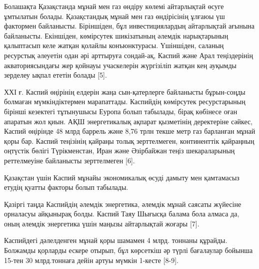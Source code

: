 \begin{multicols}{2}
Болашақта Қазақстанда мұнай мен газ өндіру көлемі айтарлықтай өсуге
ұмтылатын болады. Қазақстандық мұнай мен газ өндірісінің ұлғаюы үш
фактормен байланысты. Біріншіден, бұл инвестициялардың айтарлықтай
ағынына байланысты. Екіншіден, көмірсутек шикізатының әлемдік
нарықтарының қалыптасып келе жатқан қолайлы конъюнктурасы. Үшіншіден,
саланың ресурстық әлеуетін одан әрі арттыруға сондай-ақ, Каспий және
Арал теңіздерінің акваториясындағы жер қойнауы учаскелерін жүргізіліп
жатқан кең ауқымды зерделеу ықпал ететін болады {[}5{]}.

ХХІ ғ. Каспий өңірінің елдерін жаңа сын-қатерлерге байланысты
бұрын-соңды болмаған мүмкіндіктермен марапаттады. Каспийдің көмірсутек
ресурстарының бірінші кезектегі тұтынушысы Еуропа болып табылады, бірақ
көбінесе оған апаратын жол қиын. АҚШ энергетикалық ақпарат қызметінің
деректеріне сәйкес, Каспий өңірінде 48 млрд баррель және 8,76 трлн текше
метр газ барланған мұнай қоры бар. Каспий теңізінің қайраңы толық
зерттелмеген, континенттік қайраңның оңтүстік бөлігі Түрікменстан, Иран
және Әзірбайжан теңіз шекараларының реттелмеуіне байланысты зерттелмеген
{[}6{]}.

Қазақстан үшін Каспий мұнайы экономикалық өсуді дамыту мен қамтамасыз
етудің қуатты факторы болып табылады.

Қазіргі таңда Каспийдің әлемдік энергетика, әлемдік мұнай саясаты
жүйесіне орналасуы айқынырақ болды. Каспий Таяу Шығысқа балама бола
алмаса да, оның әлемдік энергетика үшін маңызы айтарлықтай жоғары
{[}7{]}.

Каспийдегі дәлелденген мұнай қоры шамамен 4 млрд. тоннаны құрайды.
Болжамды қорларды ескере отырып, бұл көрсеткіш әр түрлі бағалаулар
бойынша 15-тен 30 млрд.тоннаға дейін артуы мүмкін 1-кесте {[}8-9{]}.

\end{multicols}

